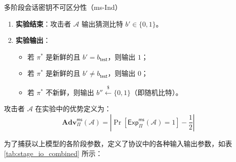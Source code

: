 \begin{definition}{多阶段会话密钥不可区分性（ms-Ind）}
\begin{enumerate}[leftmargin=*,noitemsep]
\begin{itemize}[leftmargin=*,itemsep=1.2ex]
      \item {$\mathsf{RevealRchKey}(\pi_P^i, s)$}: 返回会话 $\pi_P^i$ 在阶段 $s$ 的随机数 $\mathsf{rnd}[s]$，标记 $\mathsf{revrnd}_{\pi_P^i,s} = \mathsf{true}$。
      
      \item {$\mathsf{RevealState}(\pi_P^i, s)$}: 返回会话 $\pi_P^i$ 在阶段 $s$ 的完整状态 $\mathsf{st}[s]$，标记 $\mathsf{revstate}_{\pi_P^i,s} = \mathsf{true}$。
      
      \item {$\mathsf{Test}(\pi^*)$}: 
        \begin{itemize}[topsep=0.5ex,itemsep=0.3ex]
          \item 若 $\pi^*$ 是新鲜的（fresh），则返回：
            \[
            \begin{cases}
              \pi^*.K & \text{若 } b_{\mathsf{test}} = 0 \\
              k \xleftarrow{\$} \mathcal{K}_{\mathsf{KE}} & \text{若 } b_{\mathsf{test}} = 1
            \end{cases}
            \]
          \item 否则返回 $\bot$。
        \end{itemize}
    \end{itemize}

  \item \textbf{实验结束}：攻击者 $\mathcal{A}$ 输出猜测比特 $b' \in \{0,1\}$。

  \item \textbf{实验输出}：
    \begin{itemize}[leftmargin=*,noitemsep]
      \item 若 $\pi^*$ 是新鲜的且 $b' = b_{\mathsf{test}}$，则输出 $1$；
      \item 若 $\pi^*$ 是新鲜的且 $b' \neq b_{\mathsf{test}}$，则输出 $0$；
      \item 若 $\pi^*$ 不新鲜，则输出 $b'' \xleftarrow{\$} \{0,1\}$（即随机比特）。
    \end{itemize}
\end{enumerate}

攻击者 $\mathcal{A}$ 在实验中的优势定义为：
\[
\mathbf{Adv}_{\Pi}^{\mathsf{ms}}(\mathcal{A}) = \left| \Pr\left[ \mathsf{Exp}_{\Pi}^{\mathsf{ms}}(\mathcal{A}) = 1 \right] - \frac{1}{2} \right|
\]

\end{definition}

为了捕获以上模型的各阶段参数，定义了协议中的各种输入输出参数，如表\ref{tab:stage_io_combined} 所示：


